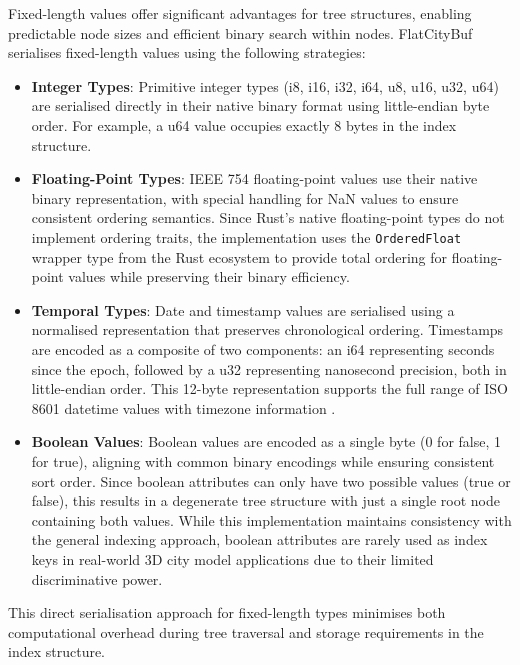 Fixed-length values offer significant advantages for tree structures, enabling predictable node sizes and efficient binary search within nodes. FlatCityBuf serialises fixed-length values using the following strategies:

\begin{itemize}
\item \textbf{Integer Types}: Primitive integer types (i8, i16, i32, i64, u8, u16, u32, u64) are serialised directly in their native binary format using little-endian byte order. For example, a u64 value occupies exactly 8 bytes in the index structure.

\item \textbf{Floating-Point Types}: IEEE 754 floating-point values \citep{ieee_754_2023} use their native binary representation, with special handling for NaN values to ensure consistent ordering semantics. Since Rust's native floating-point types do not implement ordering traits, the implementation uses the \texttt{OrderedFloat} wrapper type from the Rust ecosystem to provide total ordering for floating-point values while preserving their binary efficiency.

\item \textbf{Temporal Types}: Date and timestamp values are serialised using a normalised representation that preserves chronological ordering. Timestamps are encoded as a composite of two components: an i64 representing seconds since the epoch, followed by a u32 representing nanosecond precision, both in little-endian order. This 12-byte representation supports the full range of ISO 8601 datetime values with timezone information \citep{iso_8601_2023}.
\item \textbf{Boolean Values}: Boolean values are encoded as a single byte (0 for false, 1 for true), aligning with common binary encodings while ensuring consistent sort order. Since boolean attributes can only have two possible values (true or false), this results in a degenerate tree structure with just a single root node containing both values. While this implementation maintains consistency with the general indexing approach, boolean attributes are rarely used as index keys in real-world 3D city model applications due to their limited discriminative power.
\end{itemize}

This direct serialisation approach for fixed-length types minimises both computational overhead during tree traversal and storage requirements in the index structure.

